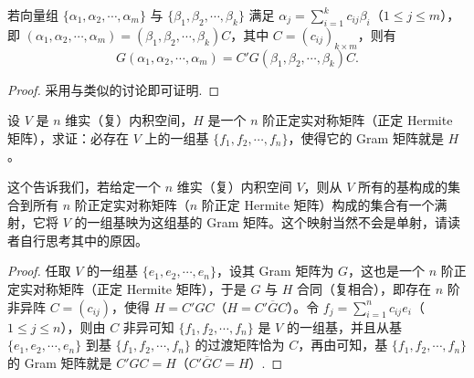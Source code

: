 \documentclass[../../main.tex]{subfiles}%
\begin{document}
\begin{corollary}\label{corollary:例9.3的推论}
若向量组 $\{\alpha_1,\alpha_2,\cdots,\alpha_m\}$ 与 $\{\beta_1,\beta_2,\cdots,\beta_k\}$ 满足 $\alpha_j = \sum_{i = 1}^{k}c_{ij}\beta_i$（$1\leqslant  j\leqslant  m$），即 $(\alpha_1,\alpha_2,\cdots,\alpha_m)=(\beta_1,\beta_2,\cdots,\beta_k)C$，其中 $C = (c_{ij})_{k\times m}$，则有
\[
G(\alpha_1,\alpha_2,\cdots,\alpha_m)=C'G(\beta_1,\beta_2,\cdots,\beta_k)C.
\]
\end{corollary}
\begin{proof}
采用与类似的讨论即可证明.
\end{proof}

\begin{proposition}\label{proposition:例9.4}
设 $V$ 是 $n$ 维实（复）内积空间，$H$ 是一个 $n$ 阶正定实对称矩阵（正定 Hermite 矩阵），求证：必存在 $V$ 上的一组基 $\{f_1,f_2,\cdots,f_n\}$，使得它的 Gram 矩阵就是 $H$。
\end{proposition}
\begin{remark}
这个告诉我们，若给定一个 $n$ 维实（复）内积空间 $V$，则从 $V$ 所有的基构成的集合到所有 $n$ 阶正定实对称矩阵（$n$ 阶正定 Hermite 矩阵）构成的集合有一个满射，它将 $V$ 的一组基映为这组基的 Gram 矩阵。这个映射当然不会是单射，请读者自行思考其中的原因。 
\end{remark}
\begin{proof}
任取 $V$ 的一组基 $\{e_1,e_2,\cdots,e_n\}$，设其 Gram 矩阵为 $G$，这也是一个 $n$ 阶正定实对称矩阵（正定 Hermite 矩阵），于是 $G$ 与 $H$ 合同（复相合），即存在 $n$ 阶非异阵 $C = (c_{ij})$，使得 $H = C'GC$（$H = C' \overline{G}C$）。令 $f_j = \sum_{i = 1}^{n}c_{ij}e_i$（$1 \leqslant  j \leqslant  n$），则由 $C$ 非异可知 $\{f_1,f_2,\cdots,f_n\}$ 是 $V$ 的一组基，并且从基 $\{e_1,e_2,\cdots,e_n\}$ 到基 $\{f_1,f_2,\cdots,f_n\}$ 的过渡矩阵恰为 $C$，再由可知，基 $\{f_1,f_2,\cdots,f_n\}$ 的 Gram 矩阵就是 $C'GC = H$（$C' \overline{G}C = H$）.
\end{proof}
\end{document}

